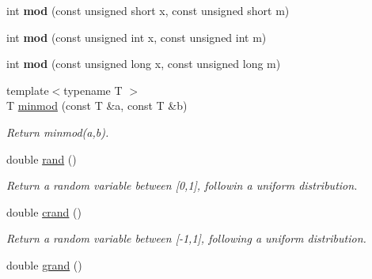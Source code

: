 \begin{DoxyCompactItemize}
\item 
\hypertarget{namespacecimg__library_1_1cimg_ad926934d269630e808a52c69a6776157}{int {\bfseries mod} (const unsigned short x, const unsigned short m)}\label{namespacecimg__library_1_1cimg_ad926934d269630e808a52c69a6776157}

\item 
\hypertarget{namespacecimg__library_1_1cimg_a2aeab862d5a2d99e80dcb0b701c197f2}{int {\bfseries mod} (const unsigned int x, const unsigned int m)}\label{namespacecimg__library_1_1cimg_a2aeab862d5a2d99e80dcb0b701c197f2}

\item 
\hypertarget{namespacecimg__library_1_1cimg_a123e1970f29995648f64ce906f8ba9fe}{int {\bfseries mod} (const unsigned long x, const unsigned long m)}\label{namespacecimg__library_1_1cimg_a123e1970f29995648f64ce906f8ba9fe}

\item 
{\footnotesize template$<$typename T $>$ }\\T \hyperlink{namespacecimg__library_1_1cimg_a5515802906984683da51c081da768759}{minmod} (const T \&a, const T \&b)
\begin{DoxyCompactList}\small\item\em Return minmod({\ttfamily a},{\ttfamily b}). \end{DoxyCompactList}\item 
\hypertarget{namespacecimg__library_1_1cimg_af31db729637ea4dad61e49e5729839c4}{double \hyperlink{namespacecimg__library_1_1cimg_af31db729637ea4dad61e49e5729839c4}{rand} ()}\label{namespacecimg__library_1_1cimg_af31db729637ea4dad61e49e5729839c4}

\begin{DoxyCompactList}\small\item\em Return a random variable between \mbox{[}0,1\mbox{]}, followin a uniform distribution. \end{DoxyCompactList}\item 
\hypertarget{namespacecimg__library_1_1cimg_aae82972570fdc0904d4f03df7b5d3023}{double \hyperlink{namespacecimg__library_1_1cimg_aae82972570fdc0904d4f03df7b5d3023}{crand} ()}\label{namespacecimg__library_1_1cimg_aae82972570fdc0904d4f03df7b5d3023}

\begin{DoxyCompactList}\small\item\em Return a random variable between \mbox{[}-\/1,1\mbox{]}, following a uniform distribution. \end{DoxyCompactList}\item 
\hypertarget{namespacecimg__library_1_1cimg_a0341a323738439349625b2de5f35bb4c}{double \hyperlink{namespacecimg__library_1_1cimg_a0341a323738439349625b2de5f35bb4c}{grand} ()}\label{namespacecimg__library_1_1cimg_a0341a323738439349625b2de5f35bb4c}


\end{DoxyCompactItemize}
